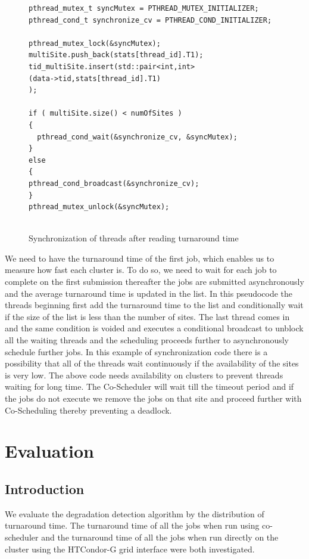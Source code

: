 \documentclass[ms,electronic,double]{nuthesis}
\begin{document}
\begin{figure}[htbp!]

\begin{lstlisting}
pthread_mutex_t syncMutex = PTHREAD_MUTEX_INITIALIZER;
pthread_cond_t synchronize_cv = PTHREAD_COND_INITIALIZER;

pthread_mutex_lock(&syncMutex);    
multiSite.push_back(stats[thread_id].T1);	
tid_multiSite.insert(std::pair<int,int>
(data->tid,stats[thread_id].T1)
);
	   
if ( multiSite.size() < numOfSites )
{
  pthread_cond_wait(&synchronize_cv, &syncMutex);
}
else
{		
pthread_cond_broadcast(&synchronize_cv);
}
pthread_mutex_unlock(&syncMutex);
    
\end{lstlisting}
\caption{Synchronization of threads after reading turnaround time}
\label{fig:synchronization}
\end{figure}
\FloatBarrier

We need to have the turnaround time of the first job,  which enables us to measure 
how fast each cluster is. To do so, we need to wait for each job to complete on 
the first submission thereafter the jobs are submitted asynchronously and the 
average turnaround time is updated in the list. In this pseudocode the threads 
beginning first add the turnaround time to the list and conditionally wait if 
the size of the list is less than the number of sites. The last thread comes in 
and the same condition is voided and executes a conditional broadcast to unblock 
all the waiting threads and the scheduling proceeds further to asynchronously schedule further 
jobs.
In this example of synchronization code there is a possibility that all of the 
threads wait continuously if the availability of the sites is very low. The 
above code needs availability on clusters to prevent threads waiting for long time. The 
Co-Scheduler will wait till the timeout period and if the jobs do not execute we 
remove the jobs on that site and proceed further with Co-Scheduling thereby preventing a deadlock.
\chapter{Evaluation}

\section{Introduction}
We evaluate the degradation detection algorithm by the distribution of turnaround time. The turnaround 
time of all the jobs when run using co-scheduler and the turnaround time of all 
the jobs when run directly on the cluster using the HTCondor-G grid interface were both investigated.
\end{document}

